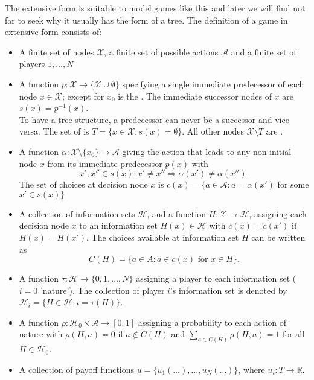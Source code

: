 \begin{definition} 
	The extensive form is suitable to model games like this and later we will find not far to seek why it usually has the form of a tree. The definition of a game in extensive form consists of:
\begin{itemize} 
	\item A finite set of nodes $\mathcal{X}$, a finite set of possible actions $\mathcal{A}$ and a finite set of players ${1, \dotsc, N}$
	\item A function $p \colon \mathcal{X} \rightarrow \{ \mathcal{X} \cup \emptyset \}$ specifying a single immediate predecessor of each node $x \in \mathcal{X}$; except for $x_{0}$ is the . The immediate successor nodes of $x$ are $s(x) = p^{-1}(x)$. \\
		To have a tree structure, a predecessor can never be a successor and vice versa. The set of  is $T = \{ x \in \mathcal{X}: s(x) = \emptyset \}$. All other nodes $\mathcal{X} \setminus T$ are .
	\item A function $\alpha \colon \mathcal{X} \setminus \{ x_{0} \} \rightarrow \mathcal{A}$ giving the action that leads to any non-initial node $x$ from its immediate predecessor $p(x)$ with
		\[ x', x'' \in s(x); x' \neq x'' \Rightarrow \alpha(x') \neq \alpha(x''). \]
		The set of choices at decision node $x$ is $c(x) = \{ a \in \mathcal{A} : a = \alpha(x')$ for some $x' \in s(x) \}$
	\item A collection of information sets $\mathcal{H}$, and a function $H : \mathcal{X} \rightarrow \mathcal{H}$, assigning each decision node $x$ to an information set $H(x) \in \mathcal{H}$ with $c(x) = c(x')$ if $H(x) = H(x')$.
		The choices available at information set $H$ can be written as
		\[ C(H) = \{a \in A : a \in c(x) \text{ for } x \in H \}. \]
	\item A function $\tau : \mathcal{H} \rightarrow \{0, 1, \dotsc, N \}$ assigning a player to each information set ($i = 0$ 'nature').
		The collection of player $i$'s information set is denoted by $\mathcal{H}_i = \{H \in \mathcal{H} : i = \tau(H) \}$.
	\item A function $\rho : \mathcal{H}_{0} \times \mathcal{A} \rightarrow [0, 1]$ assigning a probability to each action of nature with $ \rho (H,a) = 0$ if $a \notin C(H)$ and $\sum_{a \in C(H)} \rho(H,a) = 1$ for all $H \in \mathcal{H}_{0}$.
	\item A collection of payoff functions $u = \{ u_{1}(\dotsc), \dotsc, u_{N} (\dotsc) \}$, where $u_{i} \colon T \rightarrow \mathds{R}$.
\end{itemize}
\end{definition}

